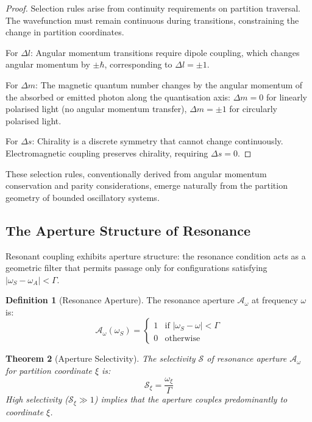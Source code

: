 \documentclass[twocolumn,10pt,a4paper]{article}
\newtheorem{theorem}{Theorem}[section]
\theoremstyle{definition}
\newtheorem{definition}[theorem]{Definition}
\theoremstyle{remark}
\newcommand{\aperture}{\mathcal{A}}
\begin{document}
\begin{proof}
Selection rules arise from continuity requirements on partition traversal. The wavefunction must remain continuous during transitions, constraining the change in partition coordinates.

For $\Delta l$: Angular momentum transitions require dipole coupling, which changes angular momentum by $\pm\hbar$, corresponding to $\Delta l = \pm 1$.

For $\Delta m$: The magnetic quantum number changes by the angular momentum of the absorbed or emitted photon along the quantisation axis: $\Delta m = 0$ for linearly polarised light (no angular momentum transfer), $\Delta m = \pm 1$ for circularly polarised light.

For $\Delta s$: Chirality is a discrete symmetry that cannot change continuously. Electromagnetic coupling preserves chirality, requiring $\Delta s = 0$.
\end{proof}

These selection rules, conventionally derived from angular momentum conservation and parity considerations, emerge naturally from the partition geometry of bounded oscillatory systems.

\subsection{The Aperture Structure of Resonance}

Resonant coupling exhibits aperture structure: the resonance condition acts as a geometric filter that permits passage only for configurations satisfying $|\omega_S - \omega_A| < \Gamma$.

\begin{definition}[Resonance Aperture]
\label{def:resonance_aperture}
The resonance aperture $\aperture_\omega$ at frequency $\omega$ is:
\begin{equation}
\aperture_\omega(\omega_S) = \begin{cases}
1 & \text{if } |\omega_S - \omega| < \Gamma \\
0 & \text{otherwise}
\end{cases}
\end{equation}
\end{definition}

\begin{theorem}[Aperture Selectivity]
\label{thm:aperture_selectivity}
The selectivity $\mathcal{S}$ of resonance aperture $\aperture_\omega$ for partition coordinate $\xi$ is:
\begin{equation}
\mathcal{S}_\xi = \frac{\omega_\xi}{\Gamma}
\end{equation}
High selectivity ($\mathcal{S}_\xi \gg 1$) implies that the aperture couples predominantly to coordinate $\xi$.
\end{theorem}
\end{document}
